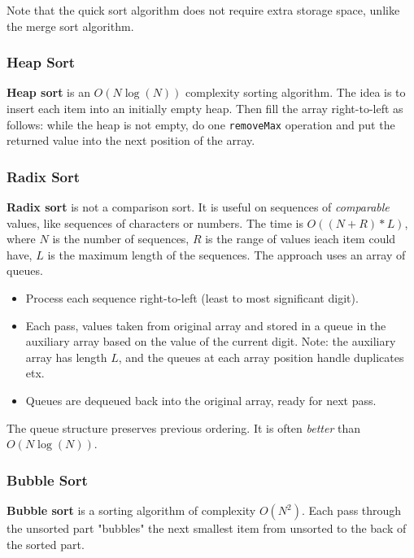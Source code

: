 Note that the quick sort algorithm does not require extra storage space, unlike the merge sort algorithm. 

\subsubsection{Heap Sort}

\textbf{Heap sort} is an $O(N \log(N))$ complexity sorting algorithm. The idea is to insert each item into an initially empty heap. Then fill the array right-to-left as follows: while the heap is not empty, do one \texttt{removeMax} operation and put the returned value into the next position of the array. 

\subsubsection{Radix Sort}

\textbf{Radix sort} is not a comparison sort. It is useful on sequences of \textit{comparable} values, like sequences of characters or numbers. The time is $O((N + R)*L)$, where $N$ is the number of sequences, $R$ is the range of values ieach item could have, $L$ is the maximum length of the sequences. The approach uses an array of queues. 

\begin{itemize}
	\item Process each sequence right-to-left (least to most significant digit).
	\item Each pass, values taken from original array and stored in a queue in the auxiliary array based on the value of the current digit. Note: the auxiliary array has length $L$, and the queues at each array position handle duplicates etx. 
	\item Queues are dequeued back into the original array, ready for next pass.
\end{itemize}

The queue structure preserves previous ordering. It is often \textit{better} than $O(N \log(N))$. 

\subsubsection{Bubble Sort}

\textbf{Bubble sort} is a sorting algorithm of complexity $O(N^{2})$. Each pass through the unsorted part "bubbles" the next smallest item from unsorted to the back of the sorted part. 

